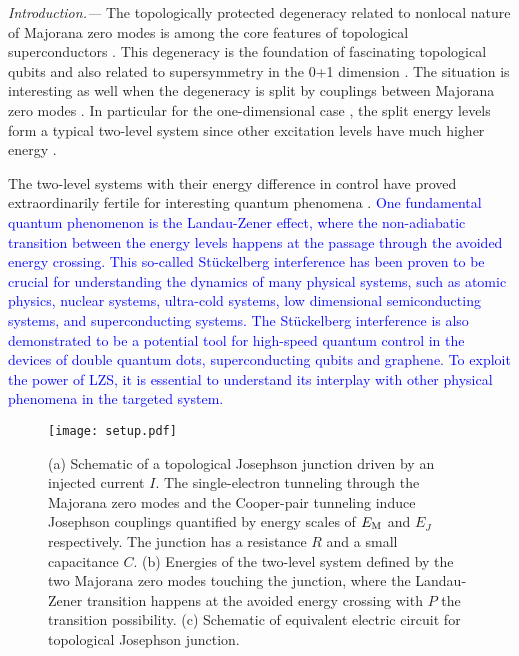 \documentclass[aps,prl,twocolumn,showpacs,showpacs,10pt,superscriptaddress]{revtex4-1}
\newcommand{\blue}[1]{\textcolor{blue}{#1}}
\begin{document}
{\it Introduction.---}
The topologically protected degeneracy related to nonlocal nature of Majorana zero modes is among the core features of topological superconductors \cite{kitaev01,kitaevaip,zhangrmp}. This degeneracy is the foundation of fascinating topological qubits \cite{fu08,sato09,Tanaka09,sauprl10,alicea12,beenakker13,franzrmp,aliceaprx,aguadoreview} and also related to supersymmetry in the 0+1 dimension \cite{Qi09,Hsieh16,Huang17}. The situation is interesting as well when the degeneracy is split by couplings between Majorana zero modes \cite{beenakker08, Cheng09, Muzushima10,tewarijpcm,marcus16}. In particular for the one-dimensional case \cite{fuprb09,Lutchyn10,oregprl10,Mourik12,Deng12}, the split energy levels form a typical two-level system since other excitation levels have much higher energy \cite{alicea12,Platero12,aguado11}.



The two-level systems with their energy difference in control have proved extraordinarily fertile for interesting quantum phenomena \cite{AllenBook,Chuang05,Morsch06,noripr}. \blue{One fundamental quantum phenomenon is the Landau-Zener effect, where the non-adiabatic transition between the energy levels happens at the passage through the avoided energy crossing. This so-called St\"{u}ckelberg interference has been proven to be crucial for understanding the dynamics of many physical systems, such as atomic physics, nuclear systems, ultra-cold systems, low dimensional semiconducting systems, and superconducting systems. The St\"{u}ckelberg interference is also demonstrated to be a potential tool for high-speed quantum control in the devices of double quantum dots, superconducting qubits and graphene. To exploit the power of LZS, it is essential to understand its interplay with other physical phenomena in the targeted system. }


\begin{figure}[b]
\begin{center}
\texttt{[image: setup.pdf]}
\caption{(a) Schematic of a topological Josephson junction driven by an injected current $I$. The single-electron tunneling through the Majorana zero modes and the Cooper-pair tunneling induce Josephson couplings quantified by energy scales of $E_{\rm M}$ and $E_J$ respectively. The junction has a resistance $R$ and a small capacitance $C$. (b) Energies of the two-level system defined by the two Majorana zero modes touching the junction, where the Landau-Zener transition happens at the avoided energy crossing with $P$ the transition possibility. (c) Schematic of equivalent electric circuit for topological Josephson junction.}
\label{fig:setup}
\end{center}
\end{figure}
\end{document}
